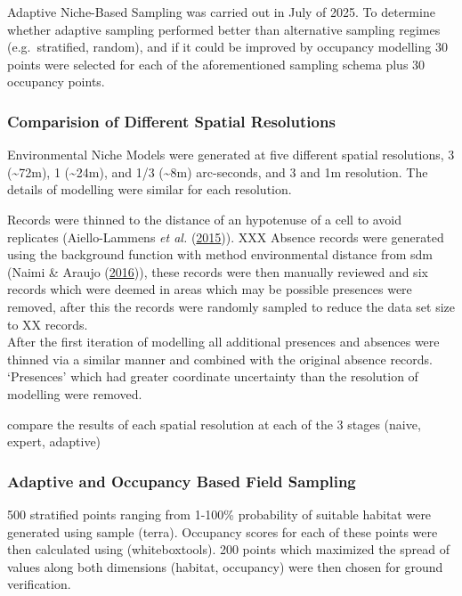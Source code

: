 \documentclass[
]{article}
\begin{document}
Adaptive Niche-Based Sampling was carried out in July of 2025. To
determine whether adaptive sampling performed better than alternative
sampling regimes (e.g.~stratified, random), and if it could be improved
by occupancy modelling 30 points were selected for each of the
aforementioned sampling schema plus 30 occupancy points.

\hypertarget{comparision-of-different-spatial-resolutions}{%
\subsubsection{Comparision of Different Spatial
Resolutions}\label{comparision-of-different-spatial-resolutions}}

Environmental Niche Models were generated at five different spatial
resolutions, 3 (\textasciitilde72m), 1 (\textasciitilde24m), and 1/3
(\textasciitilde8m) arc-seconds, and 3 and 1m resolution. The details of
modelling were similar for each resolution.

Records were thinned to the distance of an hypotenuse of a cell to avoid
replicates (Aiello-Lammens \emph{et al.}
(\protect\hyperlink{ref-aeillo2015spthin}{2015})). XXX Absence records
were generated using the background function with method environmental
distance from sdm (Naimi \& Araujo
(\protect\hyperlink{ref-naimi2016sdm}{2016})), these records were then
manually reviewed and six records which were deemed in areas which may
be possible presences were removed, after this the records were randomly
sampled to reduce the data set size to XX records.\\
After the first iteration of modelling all additional presences and
absences were thinned via a similar manner and combined with the
original absence records. `Presences' which had greater coordinate
uncertainty than the resolution of modelling were removed.

compare the results of each spatial resolution at each of the 3 stages
(naive, expert, adaptive)

\hypertarget{adaptive-and-occupancy-based-field-sampling}{%
\subsubsection{Adaptive and Occupancy Based Field
Sampling}\label{adaptive-and-occupancy-based-field-sampling}}

500 stratified points ranging from 1-100\% probability of suitable
habitat were generated using sample (terra). Occupancy scores for each
of these points were then calculated using (whiteboxtools). 200 points
which maximized the spread of values along both dimensions (habitat,
occupancy) were then chosen for ground verification.
\end{document}
